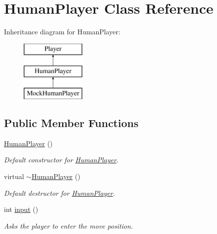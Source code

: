 \hypertarget{classHumanPlayer}{}\section{Human\+Player Class Reference}
\label{classHumanPlayer}
Inheritance diagram for Human\+Player\+:\begin{figure}[H]
\begin{center}
\leavevmode
\includegraphics[height=3.000000cm]{classHumanPlayer}
\end{center}
\end{figure}
\subsection*{Public Member Functions}
\begin{DoxyCompactItemize}
\item 
\mbox{\label{classHumanPlayer_a1cae7389c9855d4ec4e8f69cbe37e372}} 
\mbox{\hyperlink{classHumanPlayer_a1cae7389c9855d4ec4e8f69cbe37e372}{Human\+Player}} ()
\begin{DoxyCompactList}\small\item\em Default constructor for \mbox{\hyperlink{classHumanPlayer}{Human\+Player}}. \end{DoxyCompactList}\item 
\mbox{\label{classHumanPlayer_abdeb9d120fc74c8d82ec0c688883f16f}} 
virtual \mbox{\hyperlink{classHumanPlayer_abdeb9d120fc74c8d82ec0c688883f16f}{$\sim$\+Human\+Player}} ()
\begin{DoxyCompactList}\small\item\em Default destructor for \mbox{\hyperlink{classHumanPlayer}{Human\+Player}}. \end{DoxyCompactList}\item 
int \mbox{\hyperlink{classHumanPlayer_a8281fe260b25edc4451fd15ae182707f}{input}} ()
\begin{DoxyCompactList}\small\item\em Asks the player to enter the move position. \end{DoxyCompactList}\end{DoxyCompactItemize}
